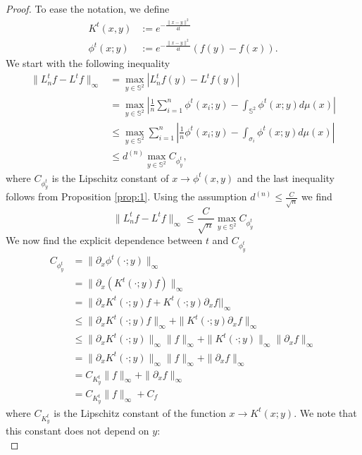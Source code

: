 \documentclass{article} %
\renewcommand{\S}{\mathbb{S}}
\begin{document}
\begin{proof}
To ease the notation, we define
\begin{align}
	K^t(x,y) &:=  e^{-\frac{\|x-y\|^2}{4t}}\\
	\phi^t(x;y) &:= e^{-\frac{\|x-y\|^2}{4t}}\left(f(y)-f(x)\right).
\end{align}
We start with the following inequality
\begin{align}
	\|L_n^tf-L^tf\|_\infty &= \max _{y\in \S^2} \left|L_n^tf(y)-L^tf(y)\right| \nonumber\\
	&= \max _{y\in \S^2} \left| \frac{1}{n} \sum_{i=1}^n \phi^t(x_i; y)- \int_{\S^2} \phi^t(x;y)d\mu(x) \right| \nonumber\\
	&\leq \max _{y\in \S^2}  \sum_{i=1}^n   \left| \frac{1}{n}  \phi^t(x_i; y)- \int_{\sigma_i} \phi^t(x;y)d\mu(x) \right| \nonumber\\
	&\leq  d^{(n)} \max _{y\in \S^2} C_{\phi^t_y} , \label{eq:prop3-base-ineq}
\end{align}
where $C_{\phi^t_y}$ is the Lipschitz constant of $x \rightarrow \phi^t(x, y)$ and the last inequality follows from Proposition \ref{prop:1}.
Using the assumption $d^{(n)}\leq \frac{C}{\sqrt{n}}$ we find
\begin{equation*}
\|L_n^tf-L^tf\|_\infty  \leq  \frac{C}{\sqrt{n}} \max _{y\in \S^2}  C_{\phi^t_y}
\end{equation*}
We now find the explicit dependence between $t$ and $C_{\phi^t_y}$
\begin{align*}
	C_{\phi^t_y} &= \|\partial_x\phi^t(\cdot;y)\|_\infty\\&
	= \|\partial_x\left(K^t(\cdot;y)f\right)\|_\infty\\&
	= \|\partial_x K^t(\cdot;y)f + K^t(\cdot;y)\partial_x f||_\infty\\&
	\leq \|\partial_x K^t(\cdot;y)f\|_\infty + \|K^t(\cdot;y)\partial_x f\|_\infty\\&
	\leq  \|\partial_x K^t(\cdot;y)\|_\infty\|f\|_\infty + \|K^t(\cdot;y)\|_\infty\|\partial_x f\|_\infty\\&
	= \|\partial_x K^t(\cdot;y)\|_\infty\|f\|_\infty + \|\partial_x f\|_\infty\\&
	= C_{K^t_y} \|f\|_\infty + \|\partial_xf\|_\infty\\&
	= C_{K^t_y} \|f\|_\infty + C_f
\end{align*}
where $C_{K^t_y}$ is the Lipschitz constant of the function $x\rightarrow K^t(x;y)$. We note that this constant does not depend on $y$:
\begin{equation*}

\end{equation*}
\end{proof}
\end{document}

